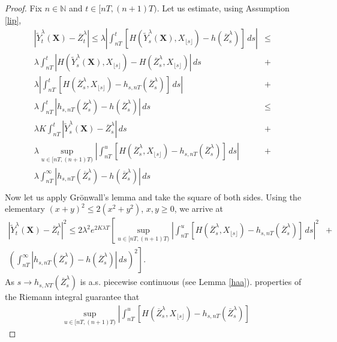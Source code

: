 \documentclass[a4paper,draft]{article}
\begin{document}
\begin{proof}
Fix $n\in\mathbb{N}$ and $t\in [nT,(n+1)T)$. Let us estimate, using Assumption \ref{lip}, 
\begin{eqnarray*}
\left|\tilde{Y}^{\lambda}_t(\mathbf{X})-\overline{Z}^{\lambda}_t\right|\leq \lambda \left\vert\int_{nT}^t
\left[H(\tilde{Y}^{\lambda}_s(\mathbf{X}),X_{\lfloor s\rfloor})-h(\overline{Z}^{\lambda}_s)\right]\, ds\right\vert
&\leq&\\
\lambda\int_{nT}^t
\left|H(\tilde{Y}^{\lambda}_s(\mathbf{X}),X_{\lfloor s\rfloor})-H(\overline{Z}^{\lambda}_s,
X_{\lfloor s\rfloor})\right|\, ds &+&\\
\lambda\left\vert\int_{nT}^t
\left[H(\overline{Z}^{\lambda}_s,X_{\lfloor s\rfloor})-h_{s,nT}(\overline{Z}^{\lambda}_s)\right]\, ds\right\vert
&+&\\
\lambda\int_{nT}^t
\left|h_{s,nT}(\overline{Z}^{\lambda}_s)-h(\overline{Z}^{\lambda}_s)\right|\, ds
&\leq&\\
\lambda K\int_{nT}^t
\left|\tilde{Y}^{\lambda}_s(\mathbf{X})-\overline{Z}^{\lambda}_s\right|\, ds
& +&\\
\lambda\sup_{u\in [nT,(n+1)T)}\left\vert\int_{nT}^u
\left[H(\overline{Z}^{\lambda}_s,X_{\lfloor s\rfloor})-h_{s,nT}(\overline{Z}^{\lambda}_s)\right]\, ds\right\vert
&+&\\
\lambda\int_{nT}^{\infty}
\left|h_{s,nT}(\overline{Z}^{\lambda}_s)-h(\overline{Z}^{\lambda}_s)\right|\, ds
& &\\
\end{eqnarray*}
Now let us apply Gr\"onwall's lemma and take the square of both sides.
Using the elementary $(x+y)^2\leq 2(x^{2}+y^{2})$, $x,y\geq 0$,
we arrive at
\begin{eqnarray}\nonumber
\left|\tilde{Y}^{\lambda}_t(\mathbf{X})-\overline{Z}^{\lambda}_t\right|^{2}
\leq 2\lambda^{2} e^{2 K\lambda T}
\left[\sup_{u\in [nT,(n+1)T)}\left\vert\int_{nT}^u
\left[H(\overline{Z}^{\lambda}_s,X_{\lfloor s\rfloor})-h_{s,nT}(\overline{Z}^{\lambda}_s)\right]
\, ds\right\vert^{2}\right.
&+&\\
\label{trafo}\left.
\left(\int_{nT}^{\infty}
\left|h_{s,nT}(\overline{Z}^{\lambda}_s)-h(\overline{Z}^{\lambda}_s)\right|\, ds\right)^{2}
\right].
\end{eqnarray}
As $s\to h_{s,NT}(\overline{Z}^{\lambda}_s)$ is a.s. piecewise continuous (see Lemma \ref{haa}).
properties of the Riemann integral guarantee that
\begin{eqnarray}\nonumber
\sup_{u\in [nT,(n+1)T)}\left\vert\int_{nT}^u
\left[H(\overline{Z}^{\lambda}_s,X_{\lfloor s\rfloor})-h_{s,nT}(\overline{Z}^{\lambda}_s)\right]

\end{eqnarray}
\end{proof}
\end{document}
